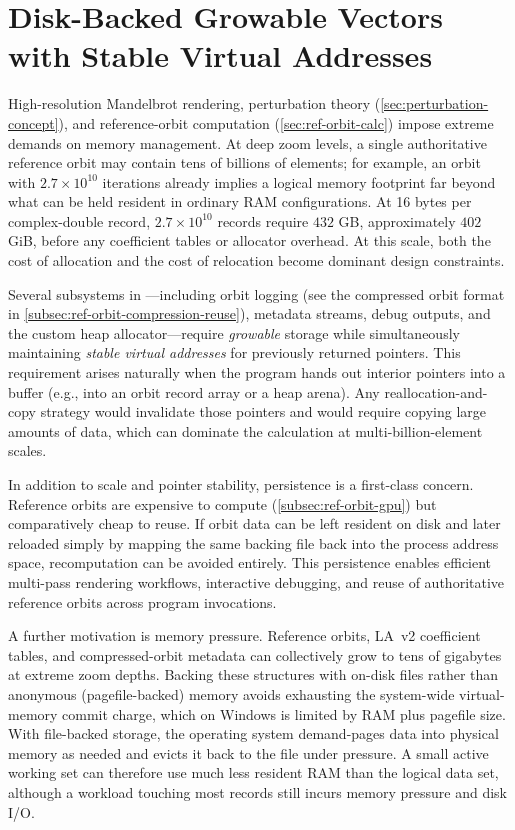 \section{Disk-Backed Growable Vectors with Stable Virtual Addresses}
\label{sec:disk_backed_growable_vectors}

High-resolution Mandelbrot rendering, perturbation theory (\cref{sec:perturbation-concept}), and reference-orbit computation (\cref{sec:ref-orbit-calc}) impose
extreme demands on memory management. At deep zoom levels, a single authoritative
reference orbit may contain tens of billions of elements; for example, an orbit
with $2.7\times10^{10}$ iterations already implies a logical memory footprint far
beyond what can be held resident in ordinary RAM configurations. At 16 bytes per
complex-double record, $2.7\times10^{10}$ records require $432$ GB, approximately
$402$ GiB, before any coefficient tables or allocator overhead.
At this scale, both the cost of allocation and the cost of relocation become
dominant design constraints.

Several subsystems in \FractalShark{}—including orbit logging (see the compressed orbit format in \cref{subsec:ref-orbit-compression-reuse}), metadata streams,
debug outputs, and the custom heap allocator—require \emph{growable} storage
while simultaneously maintaining \emph{stable virtual addresses} for previously
returned pointers. This requirement arises naturally when the program hands out
interior pointers into a buffer (e.g., into an orbit record array or a heap
arena). Any reallocation-and-copy strategy would invalidate those pointers and
would require copying large amounts of data, which can dominate the calculation at multi-billion-element scales.

In addition to scale and pointer stability, persistence is a first-class
concern. Reference orbits are expensive to compute (\cref{subsec:ref-orbit-gpu}) but comparatively cheap to
reuse. If orbit data can be left resident on disk and later reloaded simply by
mapping the same backing file back into the process address space, recomputation
can be avoided entirely. This persistence enables efficient multi-pass rendering workflows,
interactive debugging, and reuse of authoritative reference orbits across program
invocations.

A further motivation is memory pressure.  Reference orbits, LA~v2
coefficient tables, and compressed-orbit metadata can collectively
grow to tens of gigabytes at extreme zoom depths.  Backing these
structures with on-disk files rather than anonymous (pagefile-backed)
memory avoids exhausting the system-wide virtual-memory commit charge,
which on Windows is limited by RAM plus pagefile size.  With
file-backed storage, the operating system demand-pages data into
physical memory as needed and evicts it back to the file under
pressure. A small active working set can therefore use much less resident RAM
than the logical data set, although a workload touching most records still incurs
memory pressure and disk I/O.

